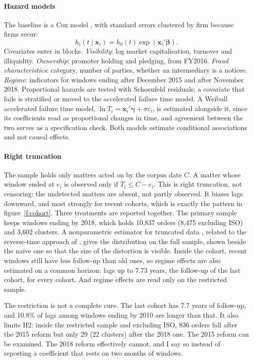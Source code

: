 \documentclass[letterpaper,11pt,leqno]{article}
\begin{document}
\paragraph{Hazard models} The baseline is a Cox model \citep{C72}, with standard errors clustered by firm because firms recur:
\begin{equation}
h_i(t \mid \bm{x}_i) = h_0(t) \exp(\bm{x}_i'\bm{\beta}).
\label{e:cox}\end{equation}
Covariates enter in blocks. \emph{Visibility}: log market capitalisation, turnover and illiquidity. \emph{Ownership}: promoter holding and pledging, from FY2016. \emph{Fraud characteristics}: category, number of parties, whether an intermediary is a noticee. \emph{Regime}: indicators for windows ending after December 2015 and after November 2018. Proportional hazards are tested with Schoenfeld residuals; a covariate that fails is stratified or moved to the accelerated failure time model. A Weibull accelerated failure time model, $\ln T_i = \bm{x}_i'\bm{\gamma} + \sigma\varepsilon_i$, is estimated alongside it, since its coefficients read as proportional changes in time, and agreement between the two serves as a specification check. Both models estimate conditional associations and not causal effects.

\paragraph{Right truncation} The sample holds only matters acted on by the corpus date $C$. A matter whose window ended at $e_i$ is observed only if $T_i \le C - e_i$. This is right truncation, not censoring: the undetected matters are absent, not partly observed. It biases lags downward, and most strongly for recent cohorts, which is exactly the pattern in figure~\ref{f:cohort}. Three treatments are reported together. The primary sample keeps windows ending by 2018, which holds 10,837 orders (8,475 excluding ISO) and 3,602 clusters. A nonparametric estimator for truncated data \citep{EP99}, related to the reverse-time approach of \citet{LBD88}, gives the distribution on the full sample, shown beside the naive one so that the size of the distortion is visible. Inside the cohort, recent windows still have less follow-up than old ones, so regime effects are also estimated on a common horizon: lags up to 7.73 years, the follow-up of the last cohort, for every cohort. And regime effects are read only on the restricted sample.

The restriction is not a complete cure. The last cohort has 7.7 years of follow-up, and 10.8\% of lags among windows ending by 2010 are longer than that. It also limits H2: inside the restricted sample and excluding ISO, 836 orders fall after the 2015 reform but only 29 (22 clusters) after the 2018 one. The 2015 reform can be examined. The 2018 reform effectively cannot, and I say so instead of reporting a coefficient that rests on two months of windows.
\end{document}
